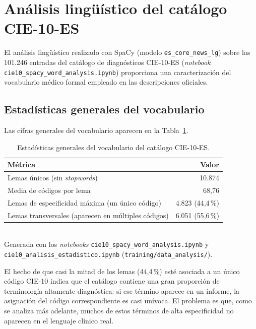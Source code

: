 \section{Análisis lingüístico del catálogo CIE-10-ES}
\label{sec:analisis-linguistico}

El análisis lingüístico realizado con SpaCy (modelo \texttt{es\_core\_news\_lg}) sobre las 101.246 entradas del catálogo de diagnósticos CIE-10-ES (\emph{notebook} \texttt{cie10\_spacy\_word\_analysis.ipynb}) proporciona una caracterización del vocabulario médico formal empleado en las descripciones oficiales.

\subsection{Estadísticas generales del vocabulario}

Las cifras generales del vocabulario aparecen en la Tabla~\ref{tab:vocab-stats}.

\begin{table}[h]
\centering
\caption{Estadísticas generales del vocabulario del catálogo CIE-10-ES.}
\label{tab:vocab-stats}
\begin{tabular}{lr}
\hline
\textbf{Métrica} & \textbf{Valor} \\
\hline
Lemas únicos (sin \emph{stopwords}) & 10.874 \\
Media de códigos por lema & 68{,}76 \\
Lemas de especificidad máxima (un único código) & 4.823 (44{,}4\,\%) \\
Lemas transversales (aparecen en múltiples códigos) & 6.051 (55{,}6\,\%) \\
\hline
\end{tabular}
\\[4pt]
{\footnotesize Generada con los \emph{notebooks} \texttt{cie10\_\allowbreak{}spacy\_\allowbreak{}word\_\allowbreak{}analysis.ipynb} y \texttt{cie10\_\allowbreak{}analisis\_\allowbreak{}estadistico.ipynb} (\texttt{training/\allowbreak{}data\_analysis/}).}
\end{table}

El hecho de que casi la mitad de los lemas (44,4\,\%) esté asociada a un único código CIE-10 indica que el catálogo contiene una gran proporción de terminología altamente diagnóstica: si ese término aparece en un informe, la asignación del código correspondiente es casi unívoca. El problema es que, como se analiza más adelante, muchos de estos términos de alta especificidad no aparecen en el lenguaje clínico real.

